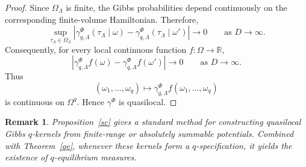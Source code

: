\documentclass[11pt,reqno]{amsart}
\newtheorem{defn}{Definition}
\newtheorem{pro}{Proposition}
\newtheorem{rk}{Remark}
\numberwithin{equation}{section} \setcounter{tocdepth}{1}
\begin{document}
\begin{proof}
	Since $\Omega_\Lambda$ is finite, the Gibbs probabilities depend
	continuously on the corresponding finite-volume Hamiltonian.
	Therefore,
	\[
	\sup_{\tau_\Lambda\in\Omega_\Lambda}
	\left|
	\gamma^\Phi_{q,\Lambda}
	(\tau_\Lambda\mid\omega)
	-
	\gamma^\Phi_{q,\Lambda}
	(\tau_\Lambda\mid\omega')
	\right|
	\longrightarrow0
	\qquad\text{as }D\to\infty.
	\]
	Consequently, for every local continuous function
	$f:\Omega\to\mathbb R$,
	\[
	\left|
	\gamma^\Phi_{q,\Lambda}f(\omega)
	-
	\gamma^\Phi_{q,\Lambda}f(\omega')
	\right|
	\longrightarrow0
	\qquad\text{as }D\to\infty.
	\]
	Thus
	\[
	(\omega_1,\ldots,\omega_q)
	\longmapsto
	\gamma^\Phi_{q,\Lambda}f(\omega_1,\ldots,\omega_q)
	\]
	is continuous on $\Omega^q$. Hence $\gamma^\Phi$ is quasilocal.
\end{proof}

\begin{rk}
	Proposition~\ref{sc} gives a standard method for constructing
	quasilocal Gibbs $q$-kernels from finite-range or absolutely summable
	potentials. Combined with Theorem~\ref{qe}, whenever these kernels
	form a $q$-specification, it yields the existence of
	$q$-equilibrium measures.
\end{rk}
%
%
%
%
%
%
\end{document}
